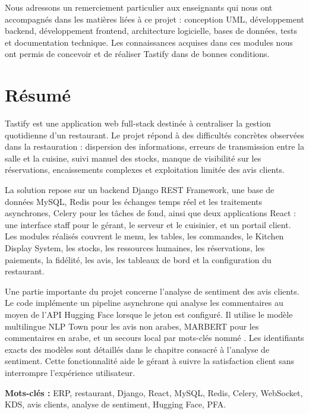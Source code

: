 Nous adressons un remerciement particulier aux enseignants qui nous ont accompagnés dans les matières liées à ce projet : conception UML, développement backend, développement frontend, architecture logicielle, bases de données, tests et documentation technique. Les connaissances acquises dans ces modules nous ont permis de concevoir et de réaliser Tastify dans de bonnes conditions.

\chapter*{Résumé}
Tastify est une application web full-stack destinée à centraliser la gestion quotidienne d'un restaurant. Le projet répond à des difficultés concrètes observées dans la restauration : dispersion des informations, erreurs de transmission entre la salle et la cuisine, suivi manuel des stocks, manque de visibilité sur les réservations, encaissements complexes et exploitation limitée des avis clients.

La solution repose sur un backend Django REST Framework, une base de données MySQL, Redis pour les échanges temps réel et les traitements asynchrones, Celery pour les tâches de fond, ainsi que deux applications React : une interface staff pour le gérant, le serveur et le cuisinier, et un portail client. Les modules réalisés couvrent le menu, les tables, les commandes, le Kitchen Display System, les stocks, les ressources humaines, les réservations, les paiements, la fidélité, les avis, les tableaux de bord et la configuration du restaurant.

Une partie importante du projet concerne l'analyse de sentiment des avis clients. Le code implémente un pipeline asynchrone qui analyse les commentaires au moyen de l'API Hugging Face lorsque le jeton est configuré. Il utilise le modèle multilingue NLP Town pour les avis non arabes, MARBERT pour les commentaires en arabe, et un secours local par mots-clés nommé . Les identifiants exacts des modèles sont détaillés dans le chapitre consacré à l'analyse de sentiment. Cette fonctionnalité aide le gérant à suivre la satisfaction client sans interrompre l'expérience utilisateur.

\textbf{Mots-clés :} ERP, restaurant, Django, React, MySQL, Redis, Celery, WebSocket, KDS, avis clients, analyse de sentiment, Hugging Face, PFA.


